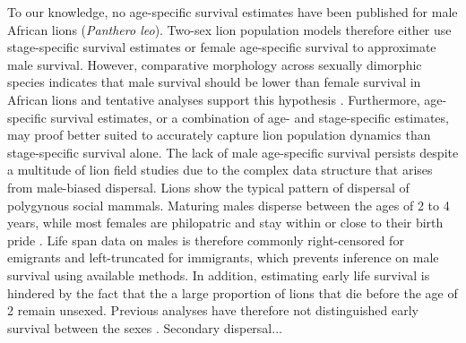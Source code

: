 To our knowledge, no age-specific survival estimates have been published for male African lions (\emph{Panthero leo}). Two-sex lion population models therefore either use stage-specific survival estimates \citep{Whitman:2004gp} or female age-specific survival \citep{Becker:2013ib,Packer:1998vr} to approximate male survival. However, comparative morphology across sexually dimorphic species indicates that male survival  should be lower than female survival in African lions and tentative analyses support this hypothesis \citep{CluttonBrock:2007vl,  Packer:1988ux, Promislow:1992uc}. Furthermore, age-specific survival estimates, or a combination of age- and stage-specific estimates, may proof better suited to accurately capture lion population dynamics than stage-specific survival alone. The lack of male age-specific survival persists despite a multitude of lion field studies \citep{Packer:2013jm} due to the complex data structure that arises from male-biased dispersal. Lions show the typical pattern of dispersal of polygynous social mammals. Maturing males disperse between the ages of 2 to 4 years, while most females are philopatric and stay within or close to their birth pride \citep{Pusey:1987vc}.  Life span data on males is therefore commonly right-censored for emigrants and left-truncated for immigrants, which prevents inference on male survival using available methods. In addition, estimating early life survival is hindered by the fact that the a large proportion of lions that die before the age of 2 remain unsexed. Previous analyses have therefore not distinguished early survival between the sexes \citep{Whitman:2004gp}. Secondary dispersal... 

